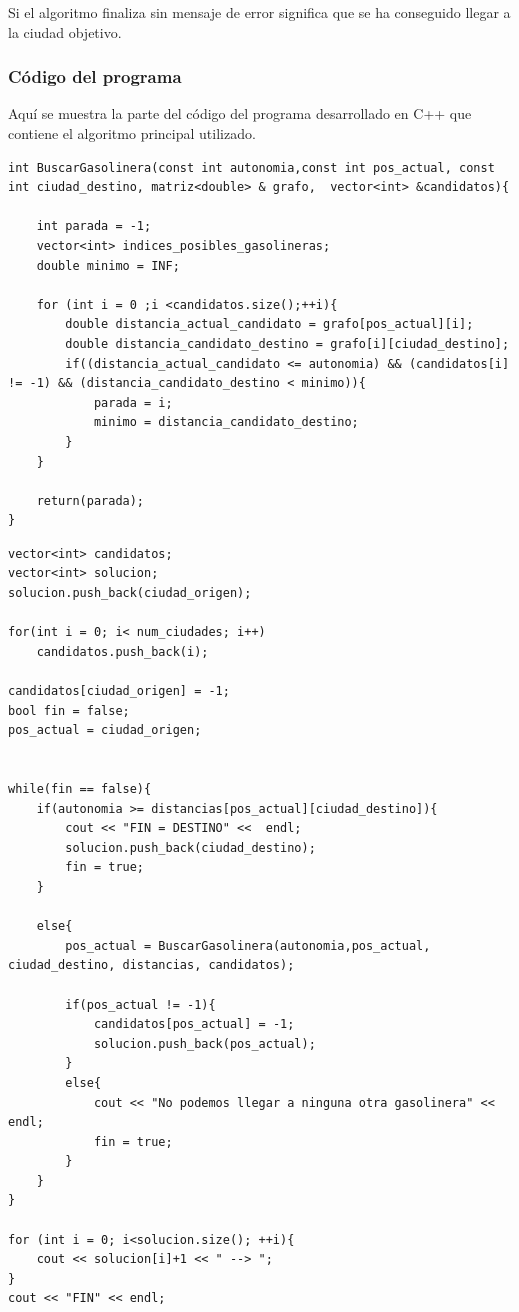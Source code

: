 \documentclass[11pt,a4paper]{article} %
\begin{document}
Si el algoritmo finaliza sin mensaje de error significa que se ha conseguido llegar a la ciudad objetivo.\\

\subsubsection{Código del programa}
Aquí se muestra la parte del código del programa desarrollado en C++ que contiene el algoritmo principal utilizado.

\begin{lstlisting}[style=C++]
int BuscarGasolinera(const int autonomia,const int pos_actual, const int ciudad_destino, matriz<double> & grafo,  vector<int> &candidatos){

	int parada = -1;
	vector<int> indices_posibles_gasolineras;
	double minimo = INF;
	
	for (int i = 0 ;i <candidatos.size();++i){
		double distancia_actual_candidato = grafo[pos_actual][i];
		double distancia_candidato_destino = grafo[i][ciudad_destino];
		if((distancia_actual_candidato <= autonomia) && (candidatos[i] != -1) && (distancia_candidato_destino < minimo)){
			parada = i;
			minimo = distancia_candidato_destino;
		}
	}
	
	return(parada);
}
\end{lstlisting}

\begin{lstlisting}[style=C++]
vector<int> candidatos;
vector<int> solucion;
solucion.push_back(ciudad_origen);

for(int i = 0; i< num_ciudades; i++)
	candidatos.push_back(i);

candidatos[ciudad_origen] = -1;
bool fin = false;
pos_actual = ciudad_origen;


while(fin == false){
	if(autonomia >= distancias[pos_actual][ciudad_destino]){
		cout << "FIN = DESTINO" <<  endl;
		solucion.push_back(ciudad_destino);
		fin = true;
	}

	else{
		pos_actual = BuscarGasolinera(autonomia,pos_actual, ciudad_destino, distancias, candidatos);
	
		if(pos_actual != -1){
			candidatos[pos_actual] = -1;
			solucion.push_back(pos_actual);
		}
		else{
			cout << "No podemos llegar a ninguna otra gasolinera" << endl;
			fin = true;
		}
	}
}

for (int i = 0; i<solucion.size(); ++i){
	cout << solucion[i]+1 << " --> ";
}
cout << "FIN" << endl;
\end{lstlisting}
\end{document}
